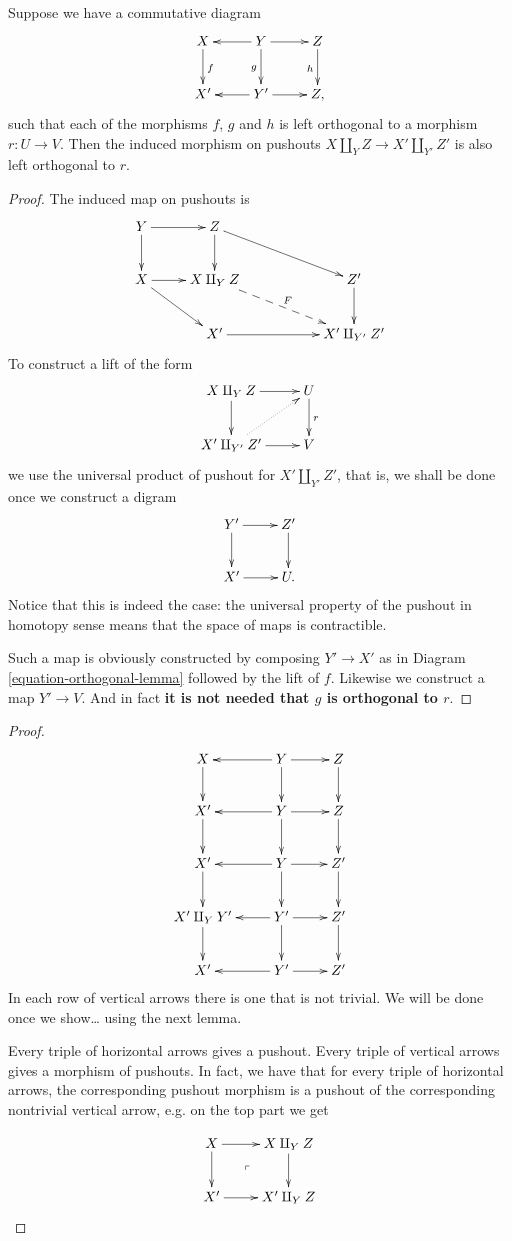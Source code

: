 \begin{lemma}
\label{lemma-ortho-pusho-diagr}
Suppose we have a commutative diagram
\begin{equation}
\label{equation-orthogonal-lemma}
\xymatrix{
X\ar[d]^f& Y \ar[l]\ar[d]_g \ar[r]&
Z\ar[d]_h\\
X'&Y' \ar[l]\ar[r]&Z,
}
\end{equation}
such that each of the morphisms $f$, $g$ and
$h$
is left orthogonal to a morphism $r:U \to V$.
Then the induced morphism on pushouts
$X \amalg_Y Z \to X' \amalg_{Y'}Z'$ is
also left orthogonal to $r$.
\end{lemma}

\begin{proof}
The induced map on pushouts is
$$
\xymatrix{
Y \ar[r] \ar[d] & Z \ar[d] \ar[rrd] & & \\
X \ar[r] \ar[rd]& X \amalg_Y Z
\ar@{-->}[rrd]^F & & Z'\ar[d] \\
&X'\ar[rr]& & X' \amalg_{Y'}Z'
}
$$
To construct a lift of the form
$$
\xymatrix{
X \amalg_Y Z\ar[r]\ar[d]&U\ar[d]^r\\
X' \amalg_{Y'}Z'\ar[r]\ar@{.>}[ur]&V
}
$$
we use the universal product of pushout for
$X' \amalg_{Y'}Z'$,
that is, we shall be done once we construct a
digram
$$
\xymatrix{
Y'\ar[r]\ar[d]&Z'\ar[d]\\
X'\ar[r]&U.
}
$$
Notice that this is indeed the case:
the universal property of the pushout
in homotopy sense means that the space of
maps
is contractible.

Such a map is obviously constructed by
composing $Y' \to X'$ as in Diagram
\ref{equation-orthogonal-lemma}
followed by the lift of $f$. Likewise
we construct a map  $Y'\to V$.
And in fact
{\bf it is not needed that $g$ is orthogonal
to $r$}.
\end{proof}

\begin{proof}
$$
\xymatrix{
X\ar[d]&Y \ar[l]\ar[d]\ar[r]&Z\ar[d]\\
X'\ar[d]&  Y \ar[l]\ar[d]\ar[r]&Z\ar[d]\\
X' \ar[d]&  Y \ar[l]\ar[d]\ar[r]& Z'\ar[d]\\
X'\amalg_Y Y'\ar[d]&  Y'\ar[l]\ar[d]\ar[r]&
Z'\ar[d]\\
X'& Y'\ar[l]\ar[r]&Z'
}
$$
In each row of vertical arrows there is one
that
is not trivial. We will be done once we show…
using
the next lemma.

Every triple of horizontal arrows gives a
pushout.
Every triple of vertical arrows gives a
morphism of pushouts.
In fact, we have that for every triple
of horizontal arrows, the corresponding
pushout
morphism is a pushout of the corresponding
nontrivial
vertical arrow, e.g. on the top part we get

$$
\xymatrix{
X\ar[r]\ar[d]\ar@{}[dr]|-{\ulcorner}&X
\amalg_YZ\ar[d]\\
X'\ar[r]&X'\amalg_YZ
}
$$

\end{proof}

